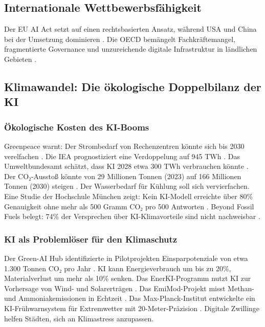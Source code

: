 \documentclass[12pt,a4paper]{article}
\begin{document}
	\subsection{Internationale Wettbewerbsfähigkeit}
	
	Der EU AI Act setzt auf einen rechtsbasierten Ansatz, während USA und China bei der Umsetzung dominieren \cite{GlobalAI2025}. Die OECD bemängelt Fachkräftemangel, fragmentierte Governance und unzureichende digitale Infrastruktur in ländlichen Gebieten \cite{OECD2025}.
	
	\subsection{Klimawandel: Die ökologische Doppelbilanz der KI}
	
	\subsubsection{Ökologische Kosten des KI-Booms}
	
	Greenpeace warnt: Der Strombedarf von Rechenzentren könnte sich bis 2030 verelfachen \cite{Greenpeace2025}. Die IEA prognostiziert eine Verdoppelung auf 945 TWh \cite{IEA2025}. Das Umweltbundesamt schätzt, dass KI 2028 etwa 300 TWh verbrauchen könnte \cite{UBA2025}. Der CO₂-Ausstoß könnte von 29 Millionen Tonnen (2023) auf 166 Millionen Tonnen (2030) steigen \cite{Oeko2025}. Der Wasserbedarf für Kühlung soll sich vervierfachen. Eine Studie der Hochschule München zeigt: Kein KI-Modell erreichte über 80\% Genauigkeit ohne mehr als 500 Gramm CO₂ pro 500 Antworten \cite{HM2025}. Beyond Fossil Fuels belegt: 74\% der Versprechen über KI-Klimavorteile sind nicht nachweisbar \cite{BeyondFossil2026}.
	
	\subsubsection{KI als Problemlöser für den Klimaschutz}
	
	Der Green-AI Hub identifizierte in Pilotprojekten Einsparpotenziale von etwa 1.300 Tonnen CO₂ pro Jahr \cite{GreenAI2025}. KI kann Energieverbrauch um bis zu 20\%, Materialverlust um mehr als 10\% senken. Das EnerKI-Programm nutzt KI zur Vorhersage von Wind- und Solarerträgen \cite{BMWK2025}. Das EmiMod-Projekt misst Methan- und Ammoniakemissionen in Echtzeit \cite{BMEL2025}. Das Max-Planck-Institut entwickelte ein KI-Frühwarnsystem für Extremwetter mit 20-Meter-Präzision \cite{MPI2025}. Digitale Zwillinge helfen Städten, sich an Klimastress anzupassen.
	
\end{document}
